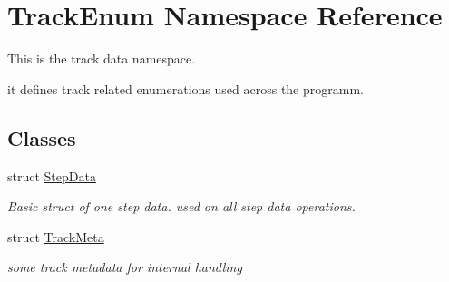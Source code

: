 \hypertarget{namespaceTrackEnum}{\section{Track\-Enum Namespace Reference}
\label{namespaceTrackEnum}
}


This is the track data namespace.\par
 it defines track related enumerations used across the programm.  


\subsection*{Classes}
\begin{DoxyCompactItemize}
\item 
struct \hyperlink{structTrackEnum_1_1StepData}{Step\-Data}
\begin{DoxyCompactList}\small\item\em Basic struct of one step data. used on all step data operations. \end{DoxyCompactList}\item 
struct \hyperlink{structTrackEnum_1_1TrackMeta}{Track\-Meta}
\begin{DoxyCompactList}\small\item\em some track metadata for internal handling \end{DoxyCompactList}\end{DoxyCompactItemize}
